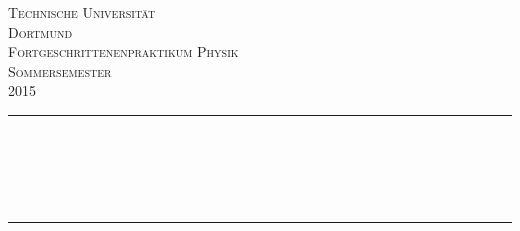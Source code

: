 \begin{titlepage}

\begin{center}

\vspace*{2cm}

\textsc{\LARGE Technische Universität\\ Dortmund}\\[1.5cm]

\textsc{\Large Fortgeschrittenenpraktikum Physik\\ Sommersemester \\ 2015}\\[0.5cm]


\newcommand{\HRule}{\rule{\linewidth}{0.5mm}}
\HRule \\[0.4cm]
{ \huge \bfseries \ENo }\\[0.4cm]
{ \huge \bfseries \EN }\\[0.4cm]
{\large \bfseries \ED }\\[0.4cm]
{\Large \textsc{\Version}}
\HRule \\[1.5cm]

\begin{minipage}{0.4\textwidth}
\begin{flushleft} \large
\Names
\end{flushleft}
\end{minipage}
\hfill
\begin{minipage}{0.5\textwidth}
\begin{flushright} \large
\Emails
\end{flushright}
\end{minipage}

\vfill



\end{center}

\end{titlepage}